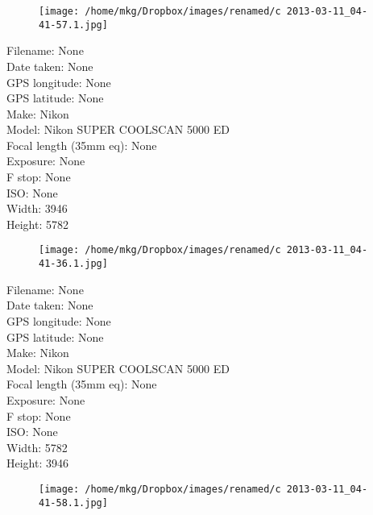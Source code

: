 \clearpage
\recalctypearea
\newpage
\noindent
\begin{figure}
    \texttt{[image: /home/mkg/Dropbox/images/renamed/c 2013-03-11\_04-41-57.1.jpg]}
\end{figure}

\clearpage
\recalctypearea
\newpage
\noindent
Filename: None\\ 
Date taken: None\\ 
GPS longitude: None\\ 
GPS latitude: None\\ 
Make: Nikon\\ 
Model: Nikon SUPER COOLSCAN 5000 ED\\ 
Focal length (35mm eq): None\\ 
Exposure: None\\ 
F stop: None\\ 
ISO: None\\ 
Width: 3946\\ 
Height: 5782\\ 

\clearpage
\recalctypearea
\newpage
\noindent
\begin{figure}
    \texttt{[image: /home/mkg/Dropbox/images/renamed/c 2013-03-11\_04-41-36.1.jpg]}
\end{figure}

\clearpage
\recalctypearea
\newpage
\noindent
Filename: None\\ 
Date taken: None\\ 
GPS longitude: None\\ 
GPS latitude: None\\ 
Make: Nikon\\ 
Model: Nikon SUPER COOLSCAN 5000 ED\\ 
Focal length (35mm eq): None\\ 
Exposure: None\\ 
F stop: None\\ 
ISO: None\\ 
Width: 5782\\ 
Height: 3946\\ 

\clearpage
\recalctypearea
\newpage
\noindent
\begin{figure}
    \texttt{[image: /home/mkg/Dropbox/images/renamed/c 2013-03-11\_04-41-58.1.jpg]}
\end{figure}

